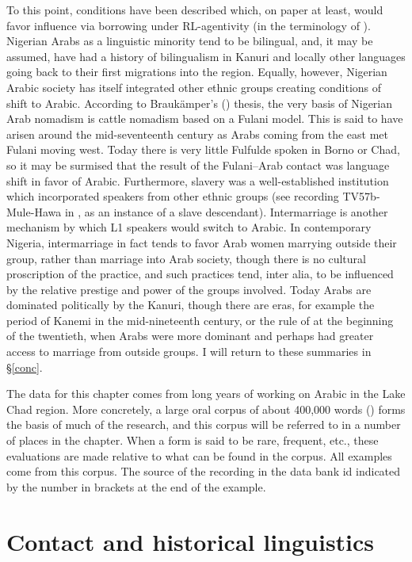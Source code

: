 \documentclass[output=paper]{langsci/langscibook}
\begin{document}
To this point, conditions have been described which, on paper at least, would favor influence via borrowing under RL-agentivity (in the terminology of \citealt{VanCoetsem1988,VanCoetsem2000}). Nigerian Arabs as a linguistic minority tend to be bilingual, and, it may be assumed, have had a history of bilingualism in Kanuri and locally other languages going back to their first migrations into the region. Equally, however, Nigerian Arabic society has itself integrated other ethnic groups creating conditions of shift to Arabic. According to Braukämper’s (\citeyear{Braukämper1994}) thesis, the very basis of Nigerian Arab nomadism is cattle nomadism based on a Fulani model. This is said to have arisen around the mid-seventeenth century as Arabs coming from the east met Fulani moving west. Today there is very little Fulfulde spoken in Borno or Chad, so it may be surmised that the result of the Fulani--Arab contact was language shift in favor of Arabic. Furthermore, slavery was a well-established institution which incorporated speakers from other ethnic groups (see recording TV57b-Mule-Hawa in \citealt{OwensHassan2011}, as an instance of a slave descendant). Intermarriage is another mechanism by which L1 speakers would switch to Arabic. In contemporary Nigeria, intermarriage in fact tends to favor Arab women marrying outside their group, rather than marriage into Arab society, though there is no cultural proscription of the practice, and such practices tend, inter alia, to be influenced by the relative prestige and power of the groups involved. Today Arabs are dominated politically by the Kanuri, though there are eras, for example the period of Kanemi in the mid-nineteenth century, or the rule of  at the beginning of the twentieth, when Arabs were more dominant and perhaps had greater access to marriage from outside groups. I will return to these summaries in §\ref{conc}.

The data for this chapter comes from long years of working on Arabic in the Lake Chad region. More concretely, a large oral corpus of about 400,000 words (\citealt{OwensHassan2011}) forms the basis of much of the research, and this corpus will be referred to in a number of places in the chapter. When a form is said to be rare, frequent, etc., these evaluations are made relative to what can be found in the corpus. All examples come from this corpus. The source of the recording in the data bank id indicated by the number in brackets at the end of the example.

\section{Contact and historical linguistics
}
\end{document}
